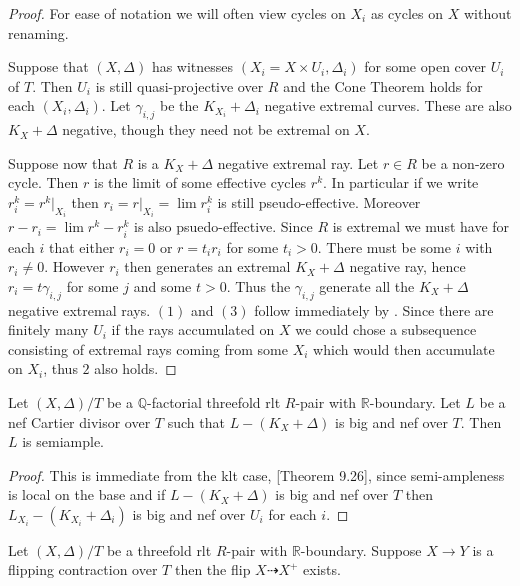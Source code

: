 	
	\begin{proof}
		
		For ease of notation we will often view cycles on $X_{i}$ as cycles on $X$ without renaming.
		
		Suppose that $(X,\Delta)$ has witnesses $(X_{i}=X \times U_{i}, \Delta_{i})$ for some open cover $U_{i}$ of $T$. Then $U_{i}$ is still quasi-projective over $R$ and the Cone Theorem holds for each $(X_{i},\Delta_{i})$. Let $\gamma_{i,j}$ be the $K_{X_{i}}+\Delta_{i}$ negative extremal curves. These are also $K_{X}+\Delta$ negative, though they need not be extremal on $X$.
		
		Suppose now that $R$ is a $K_{X}+\Delta$ negative extremal ray. Let $r\in R$ be a non-zero cycle. Then $r$ is the limit of some effective cycles $r^{k}$. In particular if we write $r^{k}_{i}=r^{k}|_{X_{i}}$ then $r_{i}=r|_{X_{i}}=\lim r^{k}_{i}$ is still pseudo-effective. Moreover $r-r_{i}=\lim r^{k}-r^{k}_{i}$ is also psuedo-effective. Since $R$ is extremal we must have for each $i$ that either $r_{i}=0$ or $r=t_{i}r_{i}$ for some $t_{i} > 0$. There must be some $i$ with $r_{i} \neq 0$. However $r_{i}$ then generates an extremal $K_{X}+\Delta$ negative ray, hence $r_{i}=t\gamma_{i,j}$ for some $j$ and some $t>0$. Thus the $\gamma_{i,j}$ generate all the $K_{X}+\Delta$ negative extremal rays. $(1)$ and $(3)$ follow immediately by \cite[Theorem H]{bhatt2020}. Since there are finitely many $U_{i}$ if the rays accumulated on $X$ we could chose a subsequence consisting of extremal rays coming from some $X_{i}$ which would then accumulate on $X_{i}$, thus $2$ also holds.
	\end{proof}

	\begin{theorem}
		Let $(X,\Delta)/T$ be a $\mathbb{Q}$-factorial threefold rlt $R$-pair with $\mathbb{R}$-boundary. Let $L$ be a nef Cartier divisor over $T$ such that $L-(K_{X}+\Delta)$ is big and nef over $T$. Then $L$ is semiample.
	\end{theorem}
	
	\begin{proof}
		This is immediate from the klt case, \cite{bhatt2020}[Theorem 9.26], since semi-ampleness is local on the base and if $L-(K_{X}+\Delta)$ is big and nef over $T$ then $L_{X_{i}}-(K_{X_{i}}+\Delta_{i})$ is big and nef over $U_{i}$ for each $i$.
	\end{proof}

	\begin{theorem}
	Let $(X,\Delta)/T$ be a threefold rlt $R$-pair with $\mathbb{R}$-boundary. Suppose $X \to Y$ is a flipping contraction over $T$ then the flip $X \dashrightarrow X^{+}$ exists. 
	\end{theorem}

